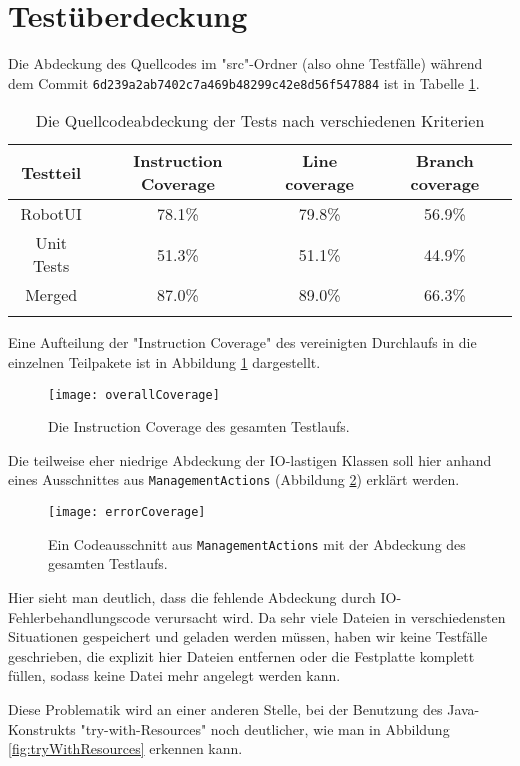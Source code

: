 \documentclass[a4paper, 11pt]{article}
\newcommand{\code}[1]{\texttt{#1}}
\begin{document}
\section{Testüberdeckung}
Die Abdeckung des Quellcodes im "src"-Ordner (also ohne Testfälle) während dem Commit \code{6d239a2ab7402c7a469b48299c42e8d56f547884} ist in Tabelle \ref{tab:coverageData}.\\
\begin{longtable}{||c|c|c|c||}
Testteil & Instruction Coverage & Line coverage & Branch coverage\\ \hline\hline
RobotUI & 78.1\%&79.8\%&56.9\%\\ \hline
Unit Tests & 51.3\%&51.1\%&44.9\%\\ \hline \hline
Merged & 87.0\%&89.0\%&66.3\%\\ \hline
\caption{Die Quellcodeabdeckung der Tests nach verschiedenen Kriterien}
\label{tab:coverageData}
\end{longtable}

Eine Aufteilung der "Instruction Coverage" des vereinigten Durchlaufs in die einzelnen Teilpakete ist in Abbildung \ref{fig:overallCoverage} dargestellt.
\begin{figure}[h]
\texttt{[image: overallCoverage]}
\caption{Die Instruction Coverage des gesamten Testlaufs.}
\label{fig:overallCoverage}
\end{figure}

Die teilweise eher niedrige Abdeckung der IO-lastigen Klassen soll hier
anhand eines Ausschnittes aus \code{ManagementActions} (Abbildung \ref{fig:errorCoverage}) erklärt werden.

\begin{figure}[h]
\texttt{[image: errorCoverage]}
\caption{Ein Codeausschnitt aus \code{ManagementActions} mit der Abdeckung des gesamten Testlaufs.}
\label{fig:errorCoverage}
\end{figure}

Hier sieht man deutlich, dass die fehlende Abdeckung durch IO-Fehlerbehandlungscode verursacht wird. Da sehr viele Dateien in verschiedensten Situationen gespeichert und geladen werden müssen, haben wir keine Testfälle geschrieben, die explizit hier Dateien entfernen oder die Festplatte komplett füllen, sodass keine Datei mehr angelegt werden kann.

Diese Problematik wird an einer anderen Stelle, bei der Benutzung des Java-Konstrukts "try-with-Resources" noch deutlicher, wie man in Abbildung \ref{fig:tryWithResources} erkennen kann.
\end{document}
